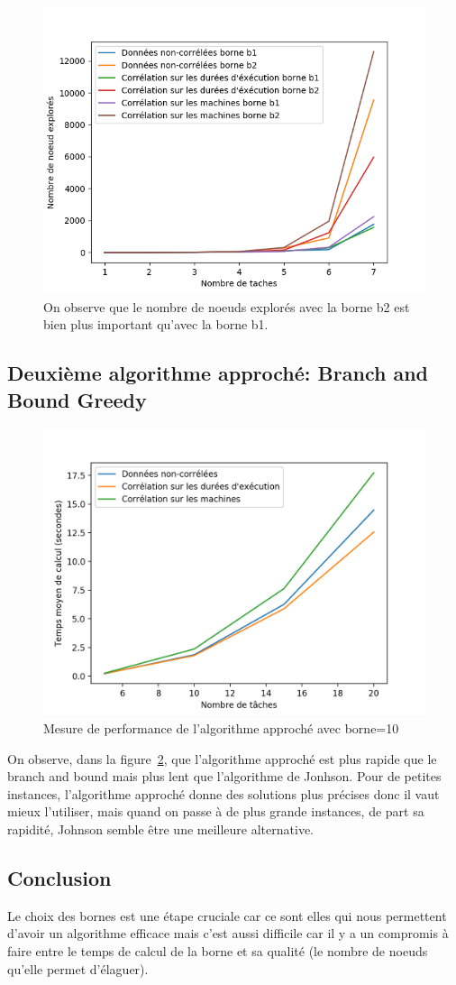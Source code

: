 \documentclass[a4paper, 10pt]{article}
\begin{document}
                \begin{figure}[h]
			\centering
			\includegraphics[width=0.75\linewidth]{graphes/b2.png}
			\caption{On observe que le nombre de noeuds explorés avec la borne b2 est bien plus important qu'avec la borne b1.}
			\label{fig:b2}
		\end{figure}
                
     \subsection*{Deuxième algorithme approché: Branch and Bound Greedy}
     
     \begin{figure}[H]
		\centering
		\includegraphics[width=0.75\linewidth]{graphes/branch_and_greed.png}
		\caption{Mesure de performance de l'algorithme approché avec borne=10}
		\label{fig:perfBorne}
    \end{figure}
    On observe, dans la figure~\ref{fig:perfBorne}, que l'algorithme approché est plus rapide que le branch and bound mais plus lent que l'algorithme de Jonhson. Pour de petites instances, l'algorithme approché donne des solutions plus précises donc il vaut mieux l'utiliser, mais quand on passe à de plus grande instances, de part sa rapidité, Johnson semble être une meilleure alternative.

                \subsection*{Conclusion}
Le choix des bornes est une étape cruciale car ce sont elles qui nous permettent d'avoir un algorithme efficace mais c'est aussi difficile car il y a un compromis à faire entre le temps de calcul de la borne et sa qualité (le nombre de noeuds qu'elle permet d'élaguer).
                  
\end{document}
